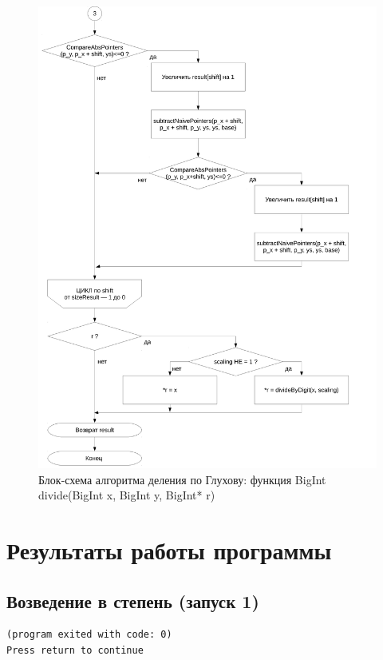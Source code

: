 \documentclass[a4paper,12pt]{article} %
\begin{document}
\begin{figure}[ht]
	\includegraphics[width=\textwidth]{lr3_divide-3.pdf}
	\caption{Блок-схема алгоритма деления по Глухову: функция BigInt divide(BigInt x, BigInt y, BigInt* r)}
\end{figure}


\clearpage

\section*{Результаты работы программы}



\subsection*{Возведение в степень (запуск 1)}
\begin{verbatim}
(program exited with code: 0)
Press return to continue
\end{verbatim}

\printbibliography
\end{document}
